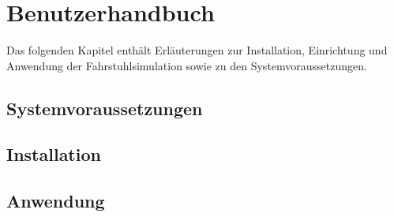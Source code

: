 \part{Benutzerhandbuch}
Das folgenden Kapitel enthält Erläuterungen zur Installation, Einrichtung und Anwendung der Fahrstuhlsimulation sowie zu den Systemvoraussetzungen.
\chapter{Systemvoraussetzungen}
\chapter{Installation}
\chapter{Anwendung}
